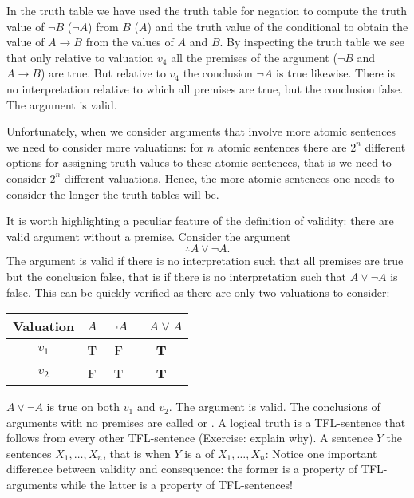 In the truth table we have used the truth table for negation to compute the truth value of $\neg B$ ($\neg A$) from $B$ ($A$) and the truth value of the conditional to obtain the value of $A\rightarrow B$ from the values of $A$ and $B$. By inspecting the truth table we see that only relative to valuation $v_4$ all the premises of the argument ($\neg B$ and $A\rightarrow B$) are true. But relative to $v_4$ the conclusion $\neg A$ is true likewise. There is no interpretation relative to which all premises are true, but the conclusion false. The argument is valid.

Unfortunately, when we consider arguments that involve more atomic sentences we need to consider more valuations: for $n$ atomic sentences there are $2^n$ different options for assigning truth values to these atomic sentences, that is we need to consider $2^n$ different valuations. Hence, the more atomic sentences one needs to consider the longer the truth tables will be. 

It is worth highlighting a peculiar feature of the definition of validity: there are valid argument without a premise. Consider the argument
$$\therefore A\vee\neg A.$$
The argument is valid if there is no interpretation such that all premises are true but the conclusion false, that is if there is no interpretation such that $A\vee\neg A$ is false. This can be quickly verified as there are only two valuations to consider:
 
 \begin{center}
\begin{tabular}{c|c|c||c}
Valuation&$A$&$\neg A$&$\neg A\vee A$\\\hline
$v_1$&T & F & \textbf{T}\\
$v_2$&F & T & \textbf{T}
\end{tabular}
\end{center} 

$A\vee\neg A$ is true on both $v_1$ and $v_2$. The argument is valid. The conclusions of arguments with no premises are called  or .
A logical truth is a TFL-sentence that follows from every other TFL-sentence (Exercise: explain why). A sentence $Y$  the sentences $X_1,\ldots,X_n$, that is when $Y$ is a  of $X_1,\ldots,X_n$:
Notice one important  difference between validity and consequence: the former is a property of TFL-arguments while the latter is a property of TFL-sentences!

